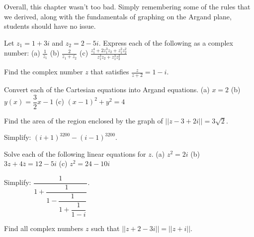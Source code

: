 \documentclass[../book.tex]{subfiles}
\begin{document}
\noindent Overall, this chapter wasn't too bad.  Simply remembering some of the rules that we derived, along with the fundamentals of graphing on the Argand plane, students should have no issue.  \vspace{3mm}
\begin{reviewset}
\item Let $z_1=1+3i$ and $z_2=2-5i$.  Express each of the following as a complex number: \newline
{\centering (a) $\displaystyle \frac{1}{z_1}$ \hspace{1in} (b) $\displaystyle \frac{2}{z_1+\overline{z_2}}$ \hspace{1in} (c) $\displaystyle \frac{z_1^4+2z_1^3z_2+z_1^2z_2^2}{z_1^3z_2+z_1^3z_2^2}$}\vspace{3mm}

\item Find the complex number $z$ that satisfies $\displaystyle \frac{z}{z+2}=1-i$.  \vspace{3mm}

\item Convert each of the Cartesian equations into Argand equations.  \newline
(a) $x=2$ \newline
(b) $y(x)=\dfrac{3}{2}x-1$ \newline 
(c) $(x-1)^2+y^2=4$ \vspace{3mm} 

\item Find the area of the region enclosed by the graph of $||z-3+2i||=3\sqrt{2}$.\vspace{3mm}

\item Simplify: $\displaystyle (i+1)^{3200}-(i-1)^{3200}$.\vspace{3mm}

\item Solve each of the following linear equations for $z$.  \newline 
(a) $z^2=2i$ \newline 
(b) $3z+4\overline{z}=12-5i$ \newline 
(c) $z^2=24-10i$ \vspace{3mm}

\item Simplify: $\dfrac{1}{1+\dfrac{1}{1-\dfrac{1}{1+\dfrac{1}{1-i}}}}$.\vspace{3mm}

\item Find all complex numbers $z$ such that $||z+2-3i||=||z+i||$.\vspace{3mm}


\end{reviewset}
\end{document}
